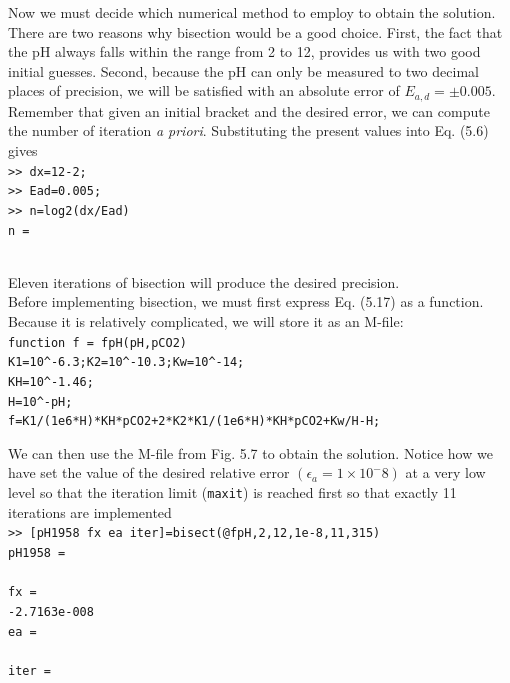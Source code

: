 \documentclass[../main.tex]{subfiles}
\begin{document}
Now we must decide which numerical method to employ to obtain the solution. There
are two reasons why bisection would be a good choice. First, the fact that the pH always
falls within the range from 2 to 12, provides us with two good initial guesses. Second, because
the pH can only be measured to two decimal places of precision, we will be satisfied
with an absolute error of $E_{a,d} = \pm0.005$. Remember that given an initial bracket and the
desired error, we can compute the number of iteration \emph{a priori}. Substituting the present values
into Eq. (5.6) gives\\

\texttt{>> dx=12-2;\\
\indent >> Ead=0.005;\\
\indent >> n=log2(dx/Ead)\\
\indent n =\\
\indent{}\\}

\noindent Eleven iterations of bisection will produce the desired precision.\\
Before implementing bisection, we must first express Eq. (5.17) as a function. Because
it is relatively complicated, we will store it as an M-file:\\

\texttt{function f = fpH(pH,pCO2)\\
\indent K1=10\textasciicircum -6.3;K2=10\textasciicircum-10.3;Kw=10\textasciicircum-14;\\
\indent KH=10\textasciicircum-1.46;\\
\indent H=10\textasciicircum-pH;\\
\indent f=K1/(1e6*H)*KH*pCO2+2*K2*K1/(1e6*H)*KH*pCO2+Kw/H-H;\\}

We can then use the M-file from Fig. 5.7 to obtain the solution. Notice how we have
set the value of the desired relative error $(\epsilon_a = 1 \times 10^-8)$ at a very low level so that the iteration
limit (\texttt{maxit}) is reached first so that exactly 11 iterations are implemented\\

\texttt{>> [pH1958 fx ea iter]=bisect(@fpH,2,12,1e-8,11,315)\\
\indent pH1958 =\\
\indent{}\\
\indent fx =\\
\indent\indent -2.7163e-008\\
\indent ea =\\
\indent{}\\
\indent iter =\\
\indent{}\\}
\newpage
\end{document}
